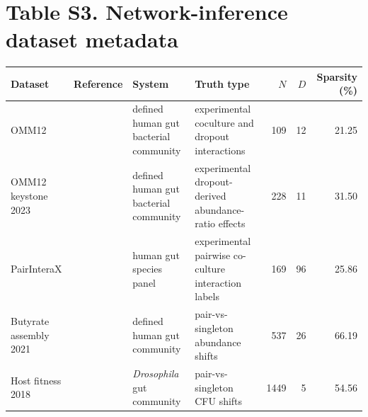 \section*{Table S3. Network-inference dataset metadata}
\scriptsize
\setlength{\tabcolsep}{2.5pt}
\begin{center}
\begin{tabular}{>{\raggedright\arraybackslash}p{}>{\raggedright\arraybackslash}p{}>{\raggedright\arraybackslash}p{}>{\raggedright\arraybackslash}p{}rrr}
\toprule
Dataset & Reference & System & Truth type & $N$ & $D$ & Sparsity (\%) \\
\midrule
OMM12 & \citealt{Weiss2022OMM12} & defined human gut bacterial community & experimental coculture and dropout interactions & 109 & 12 & 21.25 \\
OMM12 keystone 2023 & \citealt{Weiss2023Keystone} & defined human gut bacterial community & experimental dropout-derived abundance-ratio effects & 228 & 11 & 31.50 \\
PairInteraX & \citealt{Zhu2025PairInteraX} & human gut species panel & experimental pairwise co-culture interaction labels & 169 & 96 & 25.86 \\
Butyrate assembly 2021 & \citealt{Clark2021Butyrate} & defined human gut community & pair-vs-singleton abundance shifts & 537 & 26 & 66.19 \\
Host fitness 2018 & \citealt{Gould2018HostFitness} & \textit{Drosophila} gut community & pair-vs-singleton CFU shifts & 1449 & 5 & 54.56 \\
\bottomrule
\end{tabular}
\end{center}
\setlength{\tabcolsep}{6pt}
\normalsize

